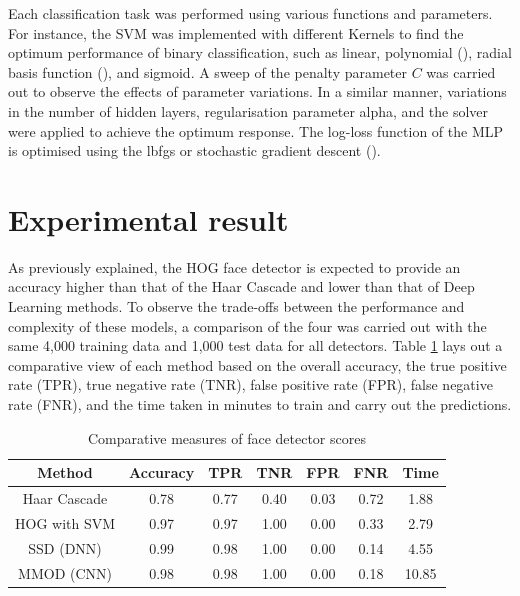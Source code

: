 \documentclass[conference]{IEEEtran}
\begin{document}
Each classification task was performed using various functions and parameters. For instance, the SVM was implemented with different Kernels to find the optimum performance of binary classification, such as linear, polynomial (), radial basis function (), and sigmoid. A sweep of the penalty parameter $C$ was carried out to observe the effects of parameter variations.
In a similar manner, variations in the number of hidden layers, regularisation parameter alpha, and the solver were applied to achieve the optimum response. The log-loss function of the MLP is optimised using the lbfgs or stochastic gradient descent ().



\section{Experimental result} \label{s-exp-res}


As previously explained, the HOG face detector is expected to provide an accuracy higher than that of the Haar Cascade and lower than that of Deep Learning methods. To observe the trade-offs between the performance and complexity of these models, a comparison of the four was carried out with the same 4,000 training data and 1,000 test data for all detectors. Table \ref{tab: face} lays out a comparative view of each method based on the overall accuracy, the true positive rate (TPR), true negative rate (TNR), false positive rate (FPR), false negative rate (FNR), and the time taken in minutes to train and carry out the predictions.

\begin{table}[htp]
\caption{Comparative measures of face detector scores}
\begin{center}
\renewcommand{\arraystretch}{1.5}
\begin{tabular}{|c|c|c|c|c|c|c|}
\hline
Method & Accuracy & TPR & TNR & FPR & FNR & Time\\ \hline
Haar Cascade & 0.78 & 0.77 & 0.40 & 0.03 & 0.72 & 1.88 \\ \hline
HOG with SVM & 0.97 & 0.97 & 1.00 & 0.00 & 0.33 & 2.79 \\ \hline
SSD (DNN) & 0.99 & 0.98 & 1.00 & 0.00 & 0.14 & 4.55\\ \hline
MMOD (CNN) & 0.98 & 0.98 & 1.00 & 0.00 & 0.18 & 10.85\\ \hline
\end{tabular}
\end{center}
\label{tab: face}
\end{table}%
\end{document}
